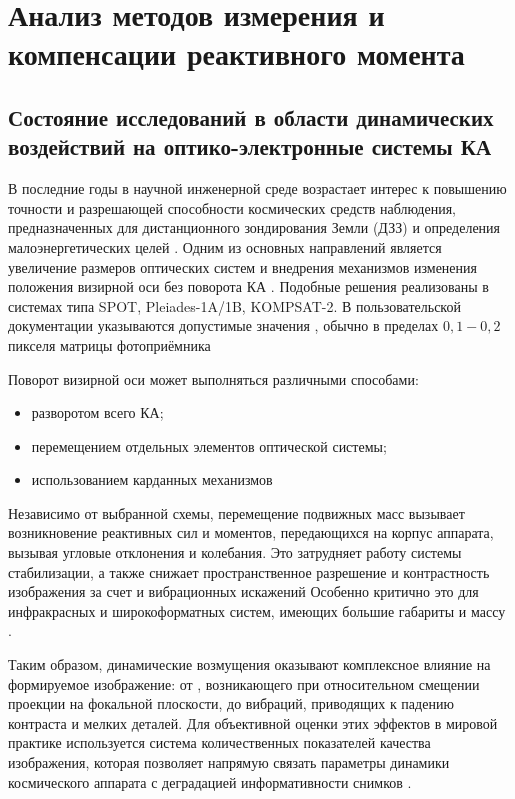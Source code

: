 \chapter{Анализ методов измерения и компенсации реактивного момента}\label{ch:ch1}
\section{Состояние исследований в области динамических воздействий на оптико-электронные системы КА}

В последние годы в научной инженерной среде возрастает интерес к повышению точности и разрешающей способности космических средств наблюдения, предназначенных для дистанционного зондирования Земли (ДЗЗ) и определения малоэнергетических целей \cite{haroon2020multisized, bouwmeester2023enabling, saunders2017building, cheng2024geometric, hamm2015earth}. Одним из основных направлений является увеличение размеров оптических систем и внедрения механизмов изменения положения визирной оси без поворота КА \cite{kandepi2024agile, franze2023attitude}. Подобные решения реализованы в системах типа SPOT, Pleiades-1A/1B, KOMPSAT-2. В пользовательской документации указываются допустимые значения , обычно в пределах $0,1-0,2$ пикселя матрицы фотоприёмника \cite{SPOT2013, Pleiades2012,KOMPSAT2008} 

Поворот визирной оси может выполняться различными способами:
\begin{itemize}
	\item разворотом всего КА;
	\item перемещением отдельных элементов оптической системы;
	\item использованием карданных механизмов \cite{leskov2010kardan,negro2023inertial}
\end{itemize}

Независимо от выбранной схемы, перемещение подвижных масс вызывает возникновение реактивных сил и моментов, передающихся на корпус аппарата, вызывая угловые отклонения и колебания. Это затрудняет работу системы стабилизации, а также снижает пространственное разрешение и контрастность изображения за счет  и вибрационных искажений  \cite{lappas2002attitude, углова2019оценка, zhao2023effect} Особенно критично это для инфракрасных и широкоформатных систем, имеющих большие габариты и массу \cite{shorthill1990infrared, shivanandan1985far,pittelkau2012pointing, dennehy2021spacecraft, alvarez2018spacecraft}.

Таким образом, динамические возмущения оказывают комплексное влияние на формируемое изображение: от , возникающего при относительном смещении проекции на фокальной плоскости, до вибраций, приводящих к падению контраста и  мелких деталей. Для объективной оценки этих эффектов в мировой практике используется система количественных показателей качества изображения, которая позволяет напрямую связать параметры динамики космического аппарата с деградацией информативности снимков \cite{gecha2021review, wahballah2018smear}.

